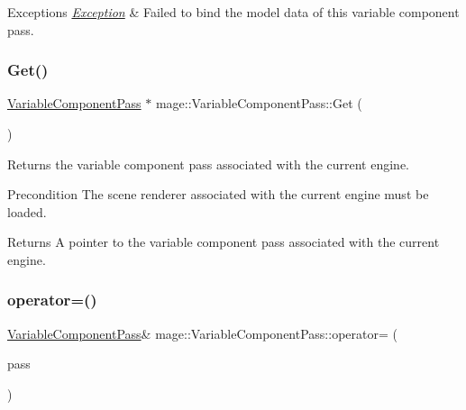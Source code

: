 \begin{DoxyExceptions}{Exceptions}
{\em \hyperlink{classmage_1_1_exception}{Exception}} & Failed to bind the model data of this variable component pass. \\
\hline
\end{DoxyExceptions}
\hypertarget{classmage_1_1_variable_component_pass_a564365cd8383c82fe94ae017b29dcdd2}{}\label{classmage_1_1_variable_component_pass_a564365cd8383c82fe94ae017b29dcdd2} 
\subsubsection{\texorpdfstring{Get()}{Get()}}
{\footnotesize\ttfamily \hyperlink{classmage_1_1_variable_component_pass}{Variable\+Component\+Pass} $\ast$ mage\+::\+Variable\+Component\+Pass\+::\+Get (\begin{DoxyParamCaption}{ }\end{DoxyParamCaption})\hspace{0.3cm}{\ttfamily [static]}}

Returns the variable component pass associated with the current engine.

\begin{DoxyPrecond}{Precondition}
The scene renderer associated with the current engine must be loaded. 
\end{DoxyPrecond}
\begin{DoxyReturn}{Returns}
A pointer to the variable component pass associated with the current engine. 
\end{DoxyReturn}
\hypertarget{classmage_1_1_variable_component_pass_a15302946b83ff045f52f0429163fd916}{}\label{classmage_1_1_variable_component_pass_a15302946b83ff045f52f0429163fd916} 
\subsubsection{\texorpdfstring{operator=()}{operator=()}\hspace{0.1cm}{\footnotesize\ttfamily [1/2]}}
{\footnotesize\ttfamily \hyperlink{classmage_1_1_variable_component_pass}{Variable\+Component\+Pass}\& mage\+::\+Variable\+Component\+Pass\+::operator= (\begin{DoxyParamCaption}\item[{const \hyperlink{classmage_1_1_variable_component_pass}{Variable\+Component\+Pass} \&}]{pass }\end{DoxyParamCaption})\hspace{0.3cm}{\ttfamily [delete]}}

